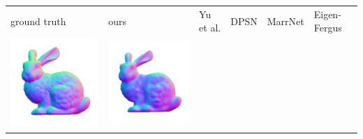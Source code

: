 \begin{center}
\begin{tabularx}{\linewidth}{@{}Y@{}Y@{}Y@{}Y@{}Y@{}Y@{}}
ground truth & ours & Yu et al. & DPSN & MarrNet & Eigen-Fergus \\
\includegraphics[width=\linewidth]{semisynthetic/20150514_14_gt.png} &
\includegraphics[width=\linewidth]{semisynthetic/20150514_14_ours_out.png} &

\end{tabularx}
\end{center}
